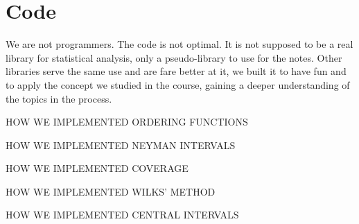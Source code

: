 \chapter{Code}


We are not programmers. The code is not optimal. It is not supposed to be a real library for statistical analysis, only a pseudo-library to use for the notes. Other libraries serve the same use and are fare better at it, we built it to have fun and to apply the concept we studied in the course, gaining a deeper understanding of the topics in the process.

HOW WE IMPLEMENTED ORDERING FUNCTIONS


HOW WE IMPLEMENTED NEYMAN INTERVALS 

HOW WE IMPLEMENTED COVERAGE 

HOW WE IMPLEMENTED WILKS' METHOD


HOW WE IMPLEMENTED CENTRAL INTERVALS
